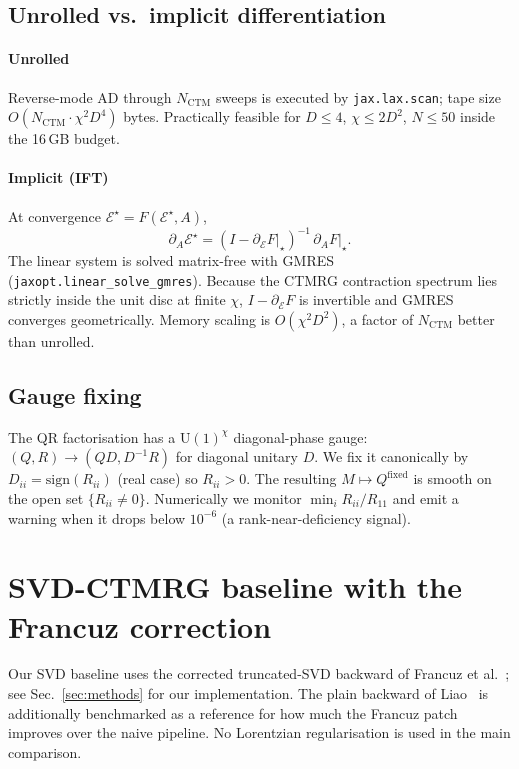 \documentclass[aps,prb,reprint,amsmath,amssymb,superscriptaddress,floatfix]{revtex4-2}
\newcommand{\bE}{\mathcal{E}}
\begin{document}
\subsection{Unrolled vs.\ implicit differentiation}

\paragraph{Unrolled} Reverse-mode AD through $N_{\text{CTM}}$ sweeps is
executed by \texttt{jax.lax.scan}; tape size $O(N_{\text{CTM}}\cdot \chi^2 D^4)$
bytes. Practically feasible for $D\le 4$, $\chi\le 2D^2$, $N\le 50$ inside
the 16\,GB budget.

\paragraph{Implicit (IFT)} At convergence $\bE^\star = F(\bE^\star, A)$,
\begin{equation}
\partial_A \bE^\star = (I - \partial_{\bE}F\big|_\star)^{-1}\,\partial_A F\big|_\star .
\end{equation}
The linear system is solved matrix-free with GMRES
(\texttt{jaxopt.linear\_solve\_gmres}). Because the CTMRG
contraction spectrum lies strictly inside the unit disc at finite $\chi$,
$I-\partial_\bE F$ is invertible and GMRES converges geometrically.
Memory scaling is $O(\chi^2 D^2)$, a factor of $N_{\text{CTM}}$ better
than unrolled.

\subsection{Gauge fixing}

The QR factorisation has a $\mathrm{U}(1)^\chi$ diagonal-phase gauge:
$(Q,R)\to (QD,D^{-1}R)$ for diagonal unitary $D$. We fix it canonically
by $D_{ii}=\mathrm{sign}(R_{ii})$ (real case) so $R_{ii}>0$. The resulting
$M\mapsto Q^{\text{fixed}}$ is smooth on the open set $\{R_{ii}\ne 0\}$.
Numerically we monitor $\min_i R_{ii}/R_{11}$ and emit a warning when it
drops below $10^{-6}$ (a rank-near-deficiency signal).

\section{SVD-CTMRG baseline with the Francuz correction}
\label{sec:svd-baseline}

Our SVD baseline uses the corrected truncated-SVD backward
of Francuz et al.~\cite{FrancuzPRR2025}; see Sec.~\ref{sec:methods} for
our implementation. The plain backward of Liao~\cite{Liao2019} is
additionally benchmarked as a reference for how much the Francuz patch
improves over the naive pipeline. No Lorentzian regularisation is used
in the main comparison.
\end{document}
